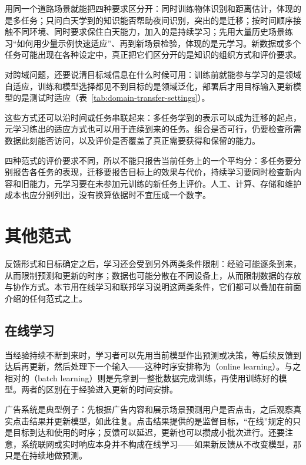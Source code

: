 用同一个道路场景就能把四种要求区分开：同时训练物体识别和距离估计，体现的是多任务；只问白天学到的知识能否帮助夜间识别，突出的是迁移；按时间顺序接触不同环境、同时要求保住白天能力，加入的是持续学习；先用大量历史场景练习“如何用少量示例快速适应”、再到新场景检验，体现的是元学习。新数据或多个任务可能出现在各种设定中，真正把它们区分开的是知识的组织方式和评价要求。

对跨域问题，还要说清目标域信息在什么时候可用：训练前就能参与学习的是领域自适应，训练和模型选择都见不到目标的是领域泛化，部署后才用目标输入更新模型的是测试时适应（表~\ref{tab:domain-transfer-settings}）。

这些方式还可以沿时间或任务串联起来：多任务学到的表示可以成为迁移的起点，元学习练出的适应方式也可以用于连续到来的任务。组合是否可行，仍要检查所需数据此刻能否访问，以及评价是否覆盖了真正需要获得和保留的能力。

四种范式的评价要求不同，所以不能只报告当前任务上的一个平均分：多任务要分别报告各任务的表现，迁移要报告目标上的效果与代价，持续学习要同时检查新内容和旧能力，元学习要在未参加元训练的新任务上评价。人工、计算、存储和维护成本也应分别列出，没有换算依据时不宜压成一个数字。

\section{其他范式}
\label{sec:other-learning-settings}

反馈形式和目标确定之后，学习还会受到另外两类条件限制：经验可能逐条到来，从而限制预测和更新的时序；数据也可能分散在不同设备上，从而限制数据的存放与协作方式。本节用在线学习和联邦学习说明这两类条件，它们都可以叠加在前面介绍的任何范式之上。

\subsection{在线学习}
\label{sec:online-learning}

当经验持续不断到来时，学习者可以先用当前模型作出预测或决策，等后续反馈到达后再更新，然后处理下一个输入——这种时序安排称为（online learning）。与之相对的（batch learning）则是先拿到一整批数据完成训练，再使用训练好的模型。两者的区别在于经验进入更新的时间安排。

广告系统是典型例子：先根据广告内容和展示场景预测用户是否点击，之后观察真实点击结果并更新模型，如此往复。点击结果提供的是监督目标，“在线”规定的只是目标到达和使用的时序；反馈可以延迟，更新也可以攒成小批次进行。还要注意，系统联网或实时响应本身并不构成在线学习——如果新反馈从不改变模型，那只是在持续地做预测。

